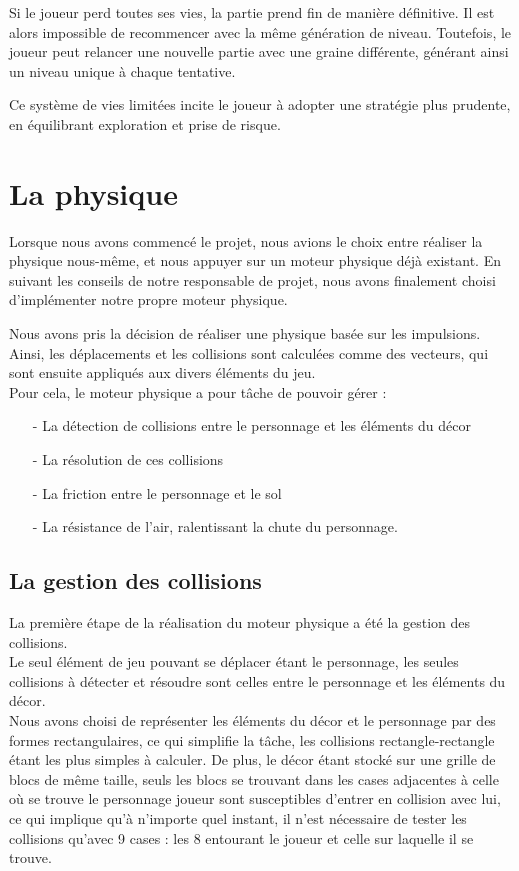 \documentclass[10pt]{report}
\begin{document}
Si le joueur perd toutes ses vies, la partie prend fin de manière définitive. Il est alors impossible de recommencer avec la même génération de niveau. Toutefois, le joueur peut relancer une nouvelle partie avec une graine différente, générant ainsi un niveau unique à chaque tentative.

Ce système de vies limitées incite le joueur à adopter une stratégie plus prudente, en équilibrant exploration et prise de risque. 

\section{La physique}
Lorsque nous avons commencé le projet, nous avions le choix entre réaliser la physique nous-même, et nous appuyer sur
un moteur physique déjà existant.
En suivant les conseils de notre responsable de projet, nous avons finalement choisi d'implémenter notre
propre moteur physique.

Nous avons pris la décision de réaliser une physique basée sur les impulsions.
Ainsi, les déplacements et les collisions sont calculées comme des vecteurs, qui sont ensuite appliqués aux
divers éléments du jeu.\\
Pour cela, le moteur physique a pour tâche de pouvoir gérer :
\begin{itemize}
  \item[-] La détection de collisions entre le personnage et les éléments du décor
  \item[-] La résolution de ces collisions
  \item[-] La friction entre le personnage et le sol
  \item[-] La résistance de l'air, ralentissant la chute du personnage.
\end{itemize}

\subsection{La gestion des collisions} \label{physique:collisions}
La première étape de la réalisation du moteur physique a été la gestion des collisions.\\
Le seul élément de jeu pouvant se déplacer étant le personnage, les seules collisions à détecter et résoudre sont
celles entre le personnage et les éléments du décor.\\
Nous avons choisi de représenter les éléments du décor et le personnage par des formes rectangulaires,
ce qui simplifie la tâche, les collisions rectangle-rectangle étant les plus simples à calculer.
De plus, le décor étant stocké sur une grille de blocs de même taille, seuls les blocs se trouvant dans les cases
adjacentes à celle où se trouve le personnage joueur sont susceptibles d'entrer en collision avec lui,
ce qui implique qu'à n'importe quel instant, il n'est nécessaire de tester les collisions qu'avec 9 cases :
les 8 entourant le joueur et celle sur laquelle il se trouve.
\end{document}
